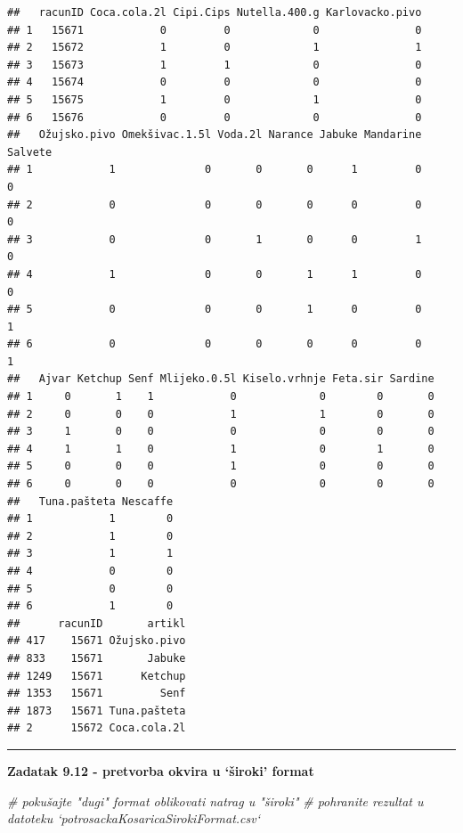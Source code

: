\documentclass[]{book}
\newenvironment{Shaded}{\begin{snugshade}}{\end{snugshade}}
\newcommand{\CommentTok}[1]{\textcolor[rgb]{0.56,0.35,0.01}{\textit{#1}}}
\theoremstyle{definition}
\theoremstyle{definition}
\theoremstyle{definition}
\theoremstyle{remark}
\begin{document}
\begin{verbatim}
##   racunID Coca.cola.2l Cipi.Cips Nutella.400.g Karlovacko.pivo
## 1   15671            0         0             0               0
## 2   15672            1         0             1               1
## 3   15673            1         1             0               0
## 4   15674            0         0             0               0
## 5   15675            1         0             1               0
## 6   15676            0         0             0               0
##   Ožujsko.pivo Omekšivac.1.5l Voda.2l Narance Jabuke Mandarine Salvete
## 1            1              0       0       0      1         0       0
## 2            0              0       0       0      0         0       0
## 3            0              0       1       0      0         1       0
## 4            1              0       0       1      1         0       0
## 5            0              0       0       1      0         0       1
## 6            0              0       0       0      0         0       1
##   Ajvar Ketchup Senf Mlijeko.0.5l Kiselo.vrhnje Feta.sir Sardine
## 1     0       1    1            0             0        0       0
## 2     0       0    0            1             1        0       0
## 3     1       0    0            0             0        0       0
## 4     1       1    0            1             0        1       0
## 5     0       0    0            1             0        0       0
## 6     0       0    0            0             0        0       0
##   Tuna.pašteta Nescaffe
## 1            1        0
## 2            1        0
## 3            1        1
## 4            0        0
## 5            0        0
## 6            1        0
##      racunID       artikl
## 417    15671 Ožujsko.pivo
## 833    15671       Jabuke
## 1249   15671      Ketchup
## 1353   15671         Senf
## 1873   15671 Tuna.pašteta
## 2      15672 Coca.cola.2l
\end{verbatim}

\begin{center}\rule{0.5\linewidth}{\linethickness}\end{center}

\textbf{Zadatak 9.12 - pretvorba okvira u `široki' format}

\begin{Shaded}
\begin{Highlighting}[]
\CommentTok{# pokušajte "dugi" format oblikovati natrag u "široki"}
\CommentTok{# pohranite rezultat u datoteku `potrosackaKosaricaSirokiFormat.csv`}
\end{Highlighting}
\end{Shaded}
\end{document}
